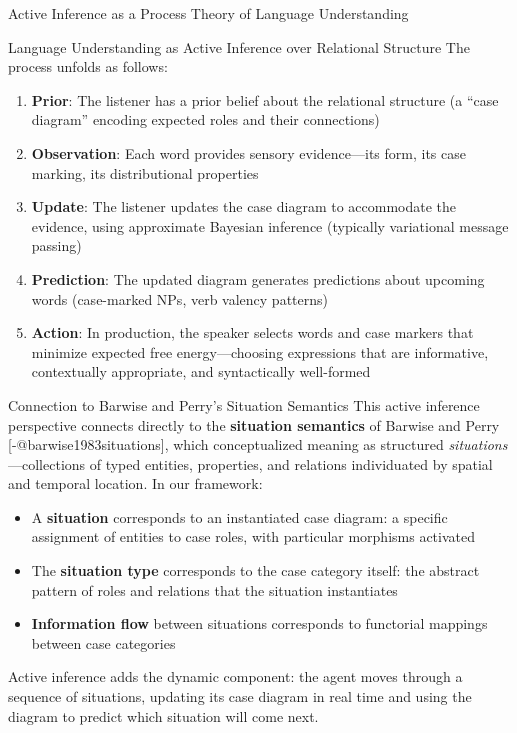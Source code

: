 \documentclass[
  ignorenonframetext,
]{beamer}
\providecommand{\tightlist}{%
  \setlength{\itemsep}{0pt}\setlength{\parskip}{0pt}}
\begin{document}
\begin{frame}{Active Inference as a Process Theory of Language
Understanding}
\begin{block}{Language Understanding as Active Inference over Relational
Structure}
The process unfolds as follows:

\begin{enumerate}
\tightlist
\item
  \textbf{Prior}: The listener has a prior belief about the relational
  structure (a ``case diagram'' encoding expected roles and their
  connections)
\item
  \textbf{Observation}: Each word provides sensory evidence---its form,
  its case marking, its distributional properties
\item
  \textbf{Update}: The listener updates the case diagram to accommodate
  the evidence, using approximate Bayesian inference (typically
  variational message passing)
\item
  \textbf{Prediction}: The updated diagram generates predictions about
  upcoming words (case-marked NPs, verb valency patterns)
\item
  \textbf{Action}: In production, the speaker selects words and case
  markers that minimize expected free energy---choosing expressions that
  are informative, contextually appropriate, and syntactically
  well-formed
\end{enumerate}
\end{block}

\begin{block}{Connection to Barwise and Perry's Situation Semantics}
\protect{}\label{connection-to-barwise-and-perrys-situation-semantics}
This active inference perspective connects directly to the
\textbf{situation semantics} of Barwise and Perry
{[}-@barwise1983situations{]}, which conceptualized meaning as
structured \emph{situations}---collections of typed entities,
properties, and relations individuated by spatial and temporal location.
In our framework:

\begin{itemize}
\tightlist
\item
  A \textbf{situation} corresponds to an instantiated case diagram: a
  specific assignment of entities to case roles, with particular
  morphisms activated
\item
  The \textbf{situation type} corresponds to the case category itself:
  the abstract pattern of roles and relations that the situation
  instantiates
\item
  \textbf{Information flow} between situations corresponds to functorial
  mappings between case categories
\end{itemize}

Active inference adds the dynamic component: the agent moves through a
sequence of situations, updating its case diagram in real time and using
the diagram to predict which situation will come next.
\end{block}
\end{frame}
\end{document}
